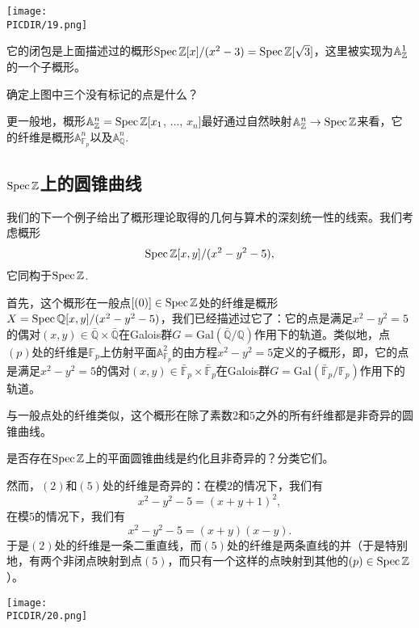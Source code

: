 \begin{center}\texttt{[image: \\PICDIR/19.png]}\end{center}

\noindent 它的闭包是上面描述过的概形$\operatorname{Spec} \mathbb{Z}[x]/(x^2-3)=\operatorname{Spec} \mathbb{Z}[\sqrt 3]$，这里被实现为$\mathbb{A}_{\mathbb{Z}}^1$的一个子概形。

\begin{exe}
	确定上图中三个没有标记的点是什么？
\end{exe}

更一般地，概形$\mathbb{A}_{\mathbb{Z}}^n=\operatorname{Spec} \mathbb{Z}[x_1$, $\dots$, $x_n]$最好通过自然映射$\mathbb{A}_{\mathbb{Z}}^n\to\operatorname{Spec} \mathbb{Z}$来看，它的纤维是概形$\mathbb{A}_{\mathbb{F}_p}^n$以及$\mathbb{A}_{\mathbb{Q}}^n$.

\subsection{\texorpdfstring{$\operatorname{Spec} \mathbb{Z}$}{Spec Z}上的圆锥曲线}\label{s:2.4.4}

我们的下一个例子给出了概形理论取得的几何与算术的深刻统一性的线索。我们考虑概形
\[
	\operatorname{Spec} \mathbb{Z}[x,y]/(x^2-y^2-5),
\]
它同构于$\operatorname{Spec} \mathbb{Z}$.

首先，这个概形在一般点$[(0)]\in \operatorname{Spec} \mathbb{Z}$处的纤维是概形$X=\operatorname{Spec} \mathbb{Q}[x,y]/(x^2-y^2-5)$，我们已经描述过它了：它的点是满足$x^2-y^2=5$的偶对$(x,y)\in \bar{\mathbb{Q}}\times \bar{\mathbb{Q}}$在Galois群$G=\mathrm{Gal}(\bar{\mathbb{Q}}/\mathbb{Q})$作用下的轨道。类似地，点$(p)$处的纤维是$\mathbb{F}_p$上仿射平面$\mathbb{A}_{\mathbb{F}_p}^2$的由方程$x^2-y^2=5$定义的子概形，即，它的点是满足$x^2-y^2=5$的偶对$(x,y)\in \bar{\mathbb{F}}_p\times \bar{\mathbb{F}}_p$在Galois群$G=\mathrm{Gal}(\bar{\mathbb{F}}_p/\mathbb{F}_p)$作用下的轨道。

与一般点处的纤维类似，这个概形在除了素数$2$和$5$之外的所有纤维都是非奇异的圆锥曲线。

\begin{exe}
	是否存在$\operatorname{Spec} \mathbb{Z}$上的平面圆锥曲线是约化且非奇异的？分类它们。
\end{exe}

然而，$(2)$和$(5)$处的纤维是奇异的：在模$2$的情况下，我们有
\[
	x^2-y^2-5=(x+y+1)^2,
\]
在模$5$的情况下，我们有
\[
	x^2-y^2-5=(x+y)(x-y).
\]
于是$(2)$处的纤维是一条二重直线，而$(5)$处的纤维是两条直线的并（于是特别地，有两个非闭点映射到点$(5)$，而只有一个这样的点映射到其他的$(p)\in \operatorname{Spec} \mathbb{Z}$）。

\begin{center}\texttt{[image: \\PICDIR/20.png]}\end{center}

